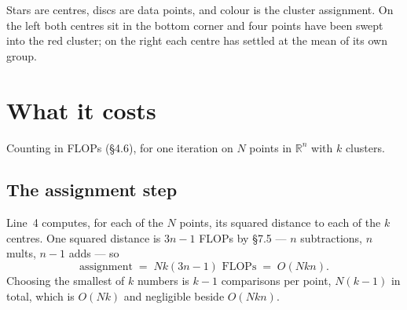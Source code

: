 \documentclass[11pt]{article}
\theoremstyle{plain}
\theoremstyle{definition}
\theoremstyle{remark}
\newcommand{\R}{\mathbb{R}}
\begin{document}
\begin{center}
\end{center}

\noindent Stars are centres, discs are data points, and colour is the cluster
assignment. On the left both centres sit in the bottom corner and four points
have been swept into the red cluster; on the right each centre has settled at
the mean of its own group.

\section{What it costs}
Counting in FLOPs (\S4.6), for one iteration on $N$ points in $\R^{n}$ with $k$
clusters.

\subsection{The assignment step}
Line~4 computes, for each of the $N$ points, its squared distance to each of the
$k$ centres. One squared distance is $3n-1$ FLOPs by \S7.5 --- $n$ subtractions,
$n$ mults, $n-1$ adds --- so
\[
  \text{assignment} \;=\; Nk(3n-1) \text{ FLOPs} \;=\; O(Nkn) .
\]
Choosing the smallest of $k$ numbers is $k-1$ comparisons per point, $N(k-1)$ in
total, which is $O(Nk)$ and negligible beside $O(Nkn)$.
\end{document}
